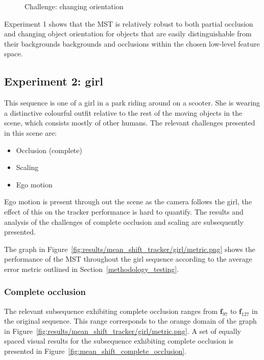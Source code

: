 \begin{figure}
{\begin{tabular}{cccc}
        \end{tabular}}
    \caption{Challenge: changing orientation\label{fig:mean_shift_orientation}
 }
\end{figure}

Experiment 1 shows that the MST is relatively robust to both partial occlusion and changing
object orientation for objects that are easily distinguishable from their
backgrounds backgrounds and occlusions within the chosen low-level feature space.

\subsection{Experiment 2: girl}
This sequence is one of a girl in a park riding around on a scooter. She is
wearing a distinctive colourful outfit relative to the rest of the moving objects in the
scene, which consists mostly of other humans.
The relevant challenges presented in this scene are:
\begin{itemize}
    \item Occlusion (complete)
    \item Scaling 
    \item Ego motion  
\end{itemize}

Ego motion is present through out the scene as the camera follows the girl, the
effect of this on the tracker performance is hard to quantify. The results and
analysis of the challenges of complete occlusion and scaling are subsequently
presented.

The graph in Figure~\ref{fig:results/mean_shift_tracker/girl/metric.png} shows the
performance of the MST throughout the girl sequence according to the average error metric outlined in
Section~\ref{methodology_testing}.  


\subsubsection{Complete occlusion}
The relevant subsequence exhibiting complete occlusion ranges from $\mathbf{f}_{97}$ to
$\mathbf{f}_{127}$ in the original sequence. This range corresponds to 
the orange domain of the graph in
Figure~\ref{fig:results/mean_shift_tracker/girl/metric.png}. 
A set of equally spaced visual results for the subsequence exhibiting complete occlusion
is presented in Figure~\ref{fig:mean_shift_complete_occlusion}.

